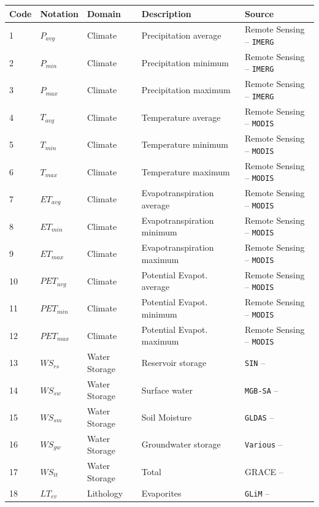\documentclass[12pt]{article}
\begin{document}
\FloatBarrier
\begin{table}[htb]
\centering
\tiny
{}
\begin{tabular}{p{0.5cm}p{1cm}p{2cm}p{3.5cm}p{5cm}}
\toprule
\textbf{Code} & \textbf{Notation} & \textbf{Domain} & \textbf{Description} & \textbf{Source} \\
\midrule
1 & $P_{avg}$ & Climate & Precipitation average & Remote Sensing -- \texttt{IMERG}\\
2 & $P_{min}$ & Climate & Precipitation minimum & Remote Sensing -- \texttt{IMERG}\\
3 & $P_{max}$ & Climate & Precipitation maximum & Remote Sensing -- \texttt{IMERG}\\
4 & $T_{avg}$ & Climate & Temperature average & Remote Sensing -- \texttt{MODIS}\\
5 & $T_{min}$ & Climate & Temperature minimum & Remote Sensing -- \texttt{MODIS}\\
6 & $T_{max}$ & Climate & Temperature maximum & Remote Sensing -- \texttt{MODIS}\\
7 & $ET_{avg}$ & Climate & Evapotranspiration average & Remote Sensing -- \texttt{MODIS}\\
8 & $ET_{min}$ & Climate & Evapotranspiration minimum & Remote Sensing -- \texttt{MODIS}\\
9 & $ET_{max}$ & Climate & Evapotranspiration maximum & Remote Sensing -- \texttt{MODIS}\\
10 & $PET_{avg}$ & Climate & Potential Evapot. average & Remote Sensing -- \texttt{MODIS}\\
11 & $PET_{min}$ & Climate & Potential Evapot. minimum & Remote Sensing -- \texttt{MODIS}\\
12 & $PET_{max}$ & Climate & Potential Evapot. maximum & Remote Sensing -- \texttt{MODIS}\\
13 & $WS_{rs}$ & Water Storage & Reservoir storage & \texttt{SIN}  -- \cite{barbedo2022ws}\\
14 & $WS_{sw}$ & Water Storage & Surface water & \texttt{MGB-SA} -- \cite{barbedo2022ws}\\
15 & $WS_{sm}$ & Water Storage & Soil Moisture & \texttt{GLDAS} -- \cite{barbedo2022ws}\\
16 & $WS_{gw}$ & Water Storage & Groundwater storage & \texttt{Various} -- \cite{barbedo2022ws}\\
17 & $WS_{tt}$ & Water Storage & Total & GRACE -- \cite{barbedo2022ws}\\
18 & $LT_{ev}$ & Lithology & Evaporites & \texttt{GLiM}  -- \cite{hartmann2012}\\

\end{tabular}
\end{table}
\end{document}
